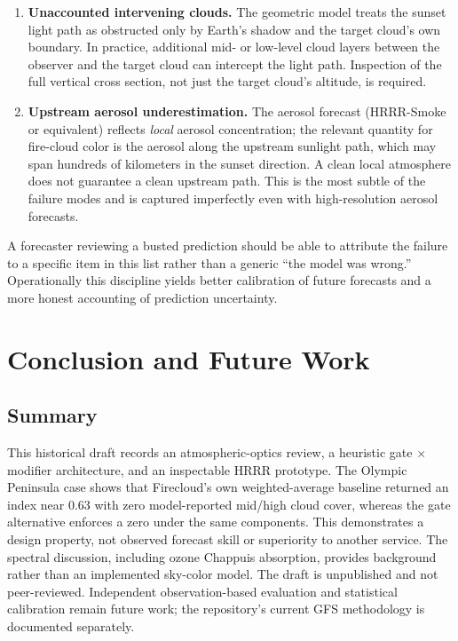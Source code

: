 \documentclass[11pt,a4paper]{article}
\begin{document}
\begin{enumerate}
\item \textbf{Unaccounted intervening clouds.} The geometric model treats the sunset light path as obstructed only by Earth's shadow and the target cloud's own boundary. In practice, additional mid- or low-level cloud layers between the observer and the target cloud can intercept the light path. Inspection of the full vertical cross section, not just the target cloud's altitude, is required.
\item \textbf{Upstream aerosol underestimation.} The aerosol forecast (HRRR-Smoke or equivalent) reflects \emph{local} aerosol concentration; the relevant quantity for fire-cloud color is the aerosol along the upstream sunlight path, which may span hundreds of kilometers in the sunset direction. A clean local atmosphere does not guarantee a clean upstream path. This is the most subtle of the failure modes and is captured imperfectly even with high-resolution aerosol forecasts.
\end{enumerate}

A forecaster reviewing a busted prediction should be able to attribute the failure to a specific item in this list rather than a generic ``the model was wrong.'' Operationally this discipline yields better calibration of future forecasts and a more honest accounting of prediction uncertainty.

\section{Conclusion and Future Work}
\label{sec:conclusion}

\subsection{Summary}

This historical draft records an atmospheric-optics review, a heuristic gate $\times$ modifier architecture, and an inspectable HRRR prototype. The Olympic Peninsula case shows that Firecloud's own weighted-average baseline returned an index near 0.63 with zero model-reported mid/high cloud cover, whereas the gate alternative enforces a zero under the same components. This demonstrates a design property, not observed forecast skill or superiority to another service. The spectral discussion, including ozone Chappuis absorption, provides background rather than an implemented sky-color model. The draft is unpublished and not peer-reviewed. Independent observation-based evaluation and statistical calibration remain future work; the repository's current GFS methodology is documented separately.
\end{document}
